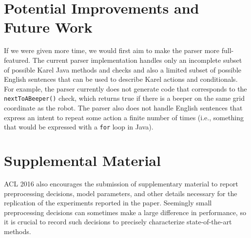\documentclass[11pt]{article}
\begin{document}
\begin{table}[ht]
\centering
{}
\caption{\label{font-table} Font guide. }
\end{table}


\section{Potential Improvements and Future Work}
If we were given more time, we would first aim to make the parser more full-featured. The current
parser implementation handles only an incomplete subset of possible Karel Java methods and checks
and also a limited subset of possible English sentences that can be used to describe Karel actions
and conditionals. For example, the parser currently does not generate code that corresponds to the
\texttt{nextToABeeper()} check, which returns true if there is a beeper on the same grid coordinate
as the robot. The parser also does not handle English sentences that express an intent to repeat
some action a finite number of times (i.e., something that would be expressed with a \texttt{for}
loop in Java).


%
%



\appendix

\section{Supplemental Material}
\label{sec:supplemental}
ACL 2016 also encourages the submission of supplementary material
to report preprocessing decisions, model parameters, and other details
necessary for the replication of the experiments reported in the
paper. Seemingly small preprocessing decisions can sometimes make
a large difference in performance, so it is crucial to record such
decisions to precisely characterize state-of-the-art methods.
\end{document}
